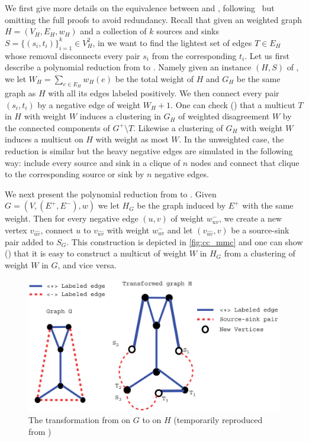 We first give more details on the equivalence between \mmc{} and \pcc{},
following~\autocite{Demaine2006} but omitting the full proofs to avoid redundancy. Recall that given
an weighted graph $H=(V_H, E_H, w_H)$ and a collection of $k$ sources and sinks
$S=\{(s_i,t_i)\}_{i=1}^k \in V_H^2$, in \mmc{} we want to find the lightest set of edges $T\in E_H$
whose removal disconnects every pair $s_i$ from the corresponding $t_i$. Let us first describe a
polynomial reduction from \mmc{} to \pcc{}. Namely given an instance $(H, S)$ of \mmc{}, we let
$W_H=\sum_{e\in E_H} w_H(e)$ be the total weight of $H$ and $G_H$ be the same graph as $H$ with all
its edges labeled positively. We then connect every pair $(s_i, t_i)$ by a negative edge of weight
$W_H+1$. One can check (\autocite[Theorem 4.7]{Demaine2006}) that a multicut $T$ in $H$ with weight
$W$ induces a clustering in $G_H$ of weighted disagreement $W$ by the connected components of
$G^+\setminus T$. Likewise a clustering of $G_H$ with weight $W$ induces a multicut on $H$ with
weight as most $W$. In the unweighted case, the reduction is similar but the heavy negative edges
are simulated in the following way: include every source and sink in a clique of $n$ nodes and
connect that clique to the corresponding source or sink by $n$ negative edges.

We next present the polynomial reduction from \pcc{} to \mmc{}. Given $G=(V, (E^+, E^-), w)$ we let
$H_G$ be the graph induced by $E^+$ with the same weight. Then for every negative edge $(u,v)$ of
weight $w_{uv}^-$, we create a new vertex $v_{\widehat{uv}}$, connect $u$ to $v_{\widehat{uv}}$ with
weight $w_{uv}^-$ and let $(v_{\widehat{uv}}, v)$ be a source-sink pair added to $S_G$. This
construction is depicted in \autoref{fig:cc_mmc} and one can show (\autocite[Theorem
4.4]{Demaine2006}) that it is easy to construct a multicut of
weight $W$ in $H_G$ from a clustering of weight $W$ in $G$, and vice versa.

\begin{figure}[htpb]
   \centering
   \includegraphics[width=0.8\linewidth]{assets/raw/cc_to_mmc.png}
   \caption{The transformation from \pcc{} on $G$ to \mmc{} on $H$ (temporarily reproduced from
   \autocite{Demaine2006}) \label{fig:cc_mmc}}
\end{figure}


